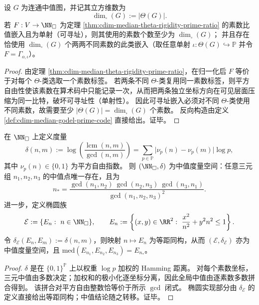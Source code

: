 \begin{corollary}[可寻址性约束下的最小素数谱与立方维数]\label{cor:cdim-median-min-prime-spectrum-cube-dimension}
设 \(G\) 为连通中值图，并记其立方维数为
\[
\dim_{\square}(G):=|\Theta(G)|.
\]
若 \(F:V\to\NN_{\square}\) 为定理 \ref{thm:cdim-median-theta-rigidity-prime-ratio} 的素数比值嵌入且为单射（可寻址），则其使用的素数个数至少为 \(\dim_{\square}(G)\)；
并且存在恰使用 \(\dim_{\square}(G)\) 个两两不同素数的此类嵌入（取任意单射 \(\iota:\Theta(G)\hookrightarrow\mathbb P\) 并令 \(F=\Gamma_{o,\iota}\)）。
\end{corollary}

\begin{proof}
由定理 \ref{thm:cdim-median-theta-rigidity-prime-ratio}，在归一化后 \(F\) 等价于对每个 \(\Theta\)-类选取一个素数标签。
若两条不同 \(\Theta\)-类复用同一素数标签，则平方自由性使该素数在算术码中只能记录一次，从而把两条独立坐标方向在可见层面压缩为同一比特，破坏可寻址性（单射性）。
因此可寻址嵌入必须对不同 \(\Theta\)-类使用不同素数，故需要至少 \(|\Theta(G)|=\dim_{\square}(G)\) 个素数。
反向构造由定义 \ref{def:cdim-median-godel-prime-code} 直接给出。证毕。
\end{proof}

\begin{theorem}[平方自由素数寄存器上的加权中值度量与椭圆实现]\label{thm:cdim-squarefree-median-metric-ellipse-realization}
在 \(\NN_{\square}\) 上定义度量
\[
\delta(n,m):=\log\!\left(\frac{\operatorname{lcm}(n,m)}{\gcd(n,m)}\right)
=\sum_{p\in\mathbb P}\bigl|\nu_p(n)-\nu_p(m)\bigr|\log p,
\]
其中 \(\nu_p(n)\in\{0,1\}\) 为平方自由指数。
则 \((\NN_{\square},\delta)\) 为中值度量空间：任意三元组 \(n_1,n_2,n_3\) 的中值点唯一存在，且为
\[
n_\ast=
\frac{\gcd(n_1,n_2)\ \gcd(n_2,n_3)\ \gcd(n_3,n_1)}
{\gcd(n_1,n_2,n_3)^2}.
\]
进一步，定义椭圆族
\[
\mathcal E:=\{E_n:\ n\in\NN_{\square}\},
\qquad
E_n:=\left\{(x,y)\in\RR^2:\ \frac{x^2}{n^2}+y^2n^2\le 1\right\}.
\]
令 \(\delta_{\mathcal E}(E_n,E_m):=\delta(n,m)\)，则映射 \(n\mapsto E_n\) 为等距同构，从而 \((\mathcal E,\delta_{\mathcal E})\) 亦为中值度量空间，且
\(
\mathrm{med}(E_{n_1},E_{n_2},E_{n_3})=E_{n_\ast}
\)。
\end{theorem}

\begin{proof}
\(\delta\) 是在 \(\{0,1\}^{\mathbb P}\) 上以权重 \(\log p\) 加权的 Hamming 距离。
对每个素数坐标，三元中值由多数决定；加权和的极小化逐坐标分离，因此全局中值由逐素数多数拼合得到。
该拼合对平方自由整数恰等价于所示 \(\gcd\) 闭式。
椭圆实现部分由 \(\delta_{\mathcal E}\) 的定义直接给出等距同构；中值结论随之转移。证毕。
\end{proof}

\endinput
